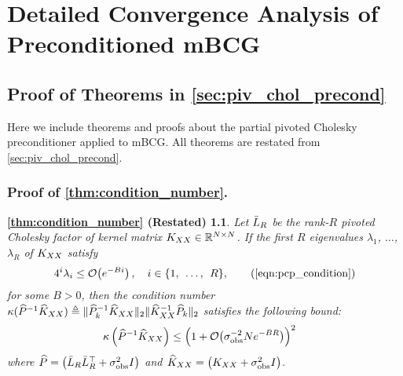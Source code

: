 \chapter{Detailed Convergence Analysis of Preconditioned mBCG}

\section{Proof of Theorems in \cref{sec:piv_chol_precond}}
\label{app:proofs}
Here we include theorems and proofs about the partial pivoted Cholesky preconditioner applied to mBCG.
All theorems are restated from \cref{sec:piv_chol_precond}.


\subsection{Proof of \cref{thm:condition_number}.}
\newtheorem*{thm:condition_number}{\cref{thm:condition_number} (Restated)}
\begin{thm:condition_number}
  Let $\bar{L}_{R}$ be the rank-$R$ pivoted Cholesky factor of kernel matrix $K_{XX} \in \mathbb{R}^{N \times N}$.
  If the first $R$ eigenvalues $\lambda_1$, $\ldots$, $\lambda_R$ of $K_{XX}$ satisfy
	\begin{equation*}
		4^{i}\lambda_{i} \leq \bigo{e^{-Bi}}, \quad i \in \{ 1, \:\: \ldots, \:\: R \},
		\tag{\ref{eqn:pcp_condition}}
	\end{equation*}
	for some $B>0$, then the condition number $\kappa(\widehat{P}^{-1}\widehat{K}_{XX}) \triangleq \Vert \widehat{P}_{k}^{-1}\widehat{K}_{XX} \Vert_{2} \Vert \widehat{K}_{XX}^{-1}\widehat{P}_{k} \Vert_{2}$
	satisfies the following bound:
  \begin{align}
    \kappa \left( \trainP^{-1}\trainK \right)
    &\leq \Bigl( 1 + \bigo{\sigma^{-2}_\text{obs} N e^{-BR}} \Bigr)^2
		\nonumber
  \end{align}
	where $\widehat{P} = \left( \bar{L}_R \bar{L}_R^\top + \sigma^2_\text{obs} I \right)$ and $\widehat{K}_{XX} = \left( K_{XX} + \sigma^2_\text{obs} I \right)$.
\end{thm:condition_number}

